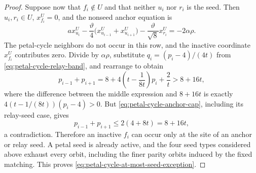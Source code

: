 \begin{proof}
Suppose now that $f_i\notin U$ and that neither $u_i$ nor $r_i$ is the seed.
Then $u_i,r_i\in U$, $x^U_{f_i}=0$, and the nonseed anchor equation is
\begin{equation*}
 a x^U_{u_i}
 -\frac{\vartheta}{4}
  \bigl(x^U_{u_{i-1}}+x^U_{u_{i+1}}\bigr)
 -\frac{\vartheta}{\sqrt8}x^U_{r_i}
 =-2\alpha\rho.
\end{equation*}
The petal-cycle neighbors do not occur in this row, and the inactive
coordinate $x^U_{f_i}$ contributes zero.  Divide by $\alpha\rho$, substitute
$q_i=(p_i-4)/(4t)$ from
\cref{eq:petal-cycle-relay-band}, and rearrange to obtain
\begin{equation}
 p_{i-1}+p_{i+1}
 =8+4\left(t-\frac1{8t}\right)p_i+\frac2t
 >8+16t,
 \label{eq:petal-cycle-neighbor-lower}
\end{equation}
where the difference between the middle expression and $8+16t$ is exactly
$4(t-1/(8t))(p_i-4)>0$.  But
\cref{eq:petal-cycle-anchor-cap}, including its relay-seed case, gives
\begin{equation*}
 p_{i-1}+p_{i+1}\leq2(4+8t)=8+16t,
\end{equation*}
a contradiction.  Therefore an inactive $f_i$ can occur only at the site of
an anchor or relay seed.  A petal seed is already active, and the four seed
types considered above exhaust every orbit, including the finer parity
orbits induced by the fixed matching.  This proves
\cref{eq:petal-cycle-at-most-seed-exception}.
\end{proof}

